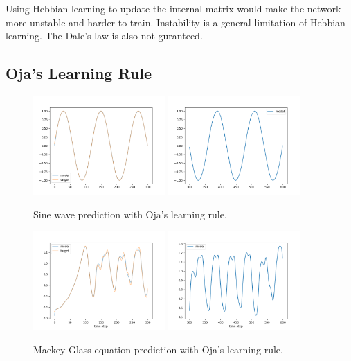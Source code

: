 \documentclass[12pt, a4paper]{article}
\begin{document}
Using Hebbian learning to update the internal matrix would make the network more unstable and harder to train. Instability is a general limitation of Hebbian learning. The Dale's law is also not guranteed.

\subsection*{Oja's Learning Rule}

\begin{figure}[H]
    \centering
    \includegraphics[width=0.45\textwidth]{fig/sin_oja_train.png}
    \includegraphics[width=0.45\textwidth]{fig/sin_oja_pred.png}
    \caption{Sine wave prediction with Oja's learning rule.}
\end{figure}

\begin{figure}[H]
    \centering
    \includegraphics[width=0.45\textwidth]{fig/MG_oja_train.png}
    \includegraphics[width=0.45\textwidth]{fig/MG_oja_pred.png}
    \caption{Mackey-Glass equation prediction with Oja's learning rule.}
\end{figure}
\end{document}
